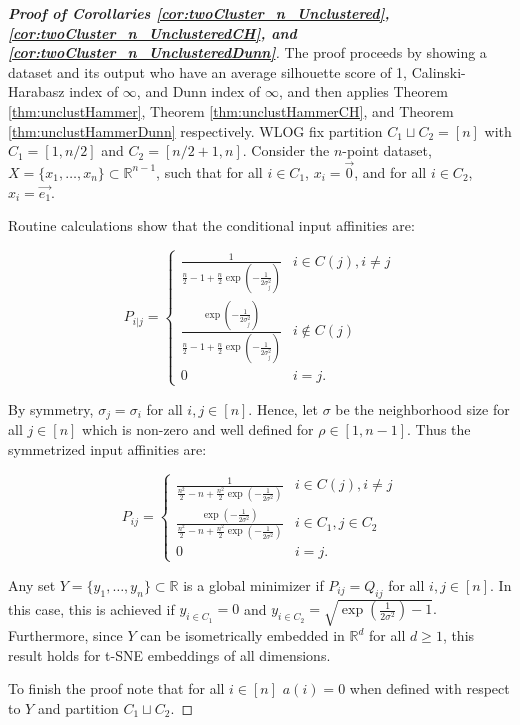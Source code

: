 \begin{proof}[\textbf{Proof of Corollaries \ref{cor:twoCluster_n_Unclustered}, \ref{cor:twoCluster_n_UnclusteredCH}, and \ref{cor:twoCluster_n_UnclusteredDunn}}]
    The proof proceeds by showing a dataset and its output who have an average silhouette score of 1, Calinski-Harabasz index of $\infty$, and Dunn index of $\infty$, and then applies Theorem \ref{thm:unclustHammer}, Theorem \ref{thm:unclustHammerCH}, and Theorem \ref{thm:unclustHammerDunn} respectively. WLOG fix partition $C_1 \sqcup C_2 = [n]$ with $C_1=[1,n/2]$ and $C_2 = [n/2+1,n]$. Consider the $n$-point dataset, $X=\{x_1, \dots, x_n\} \subset \mathbb{R}^{n-1}$, such that for all $i \in C_1$, $x_i = \vec{0}$, and for all $i \in C_2$, $x_i = \vec{e_1}$.
    
    Routine calculations show that the conditional input affinities are:

    $$P_{i|j} = \begin{cases} 
          \frac{1}{\frac{n}{2}-1+\frac{n}{2}\exp\left(-\frac{1}{2\sigma^2_j} \right)} & i \in C(j), i \neq j \\
          \frac{\exp\left(-\frac{1}{2\sigma^2_j} \right)}{\frac{n}{2}-1+\frac{n}{2}\exp\left(-\frac{1}{2\sigma^2_j} \right)} & i \not\in C(j)\\
          0 & i = j.
       \end{cases}$$

    By symmetry, $\sigma_j = \sigma_i$ for all $i,j \in [n].$ Hence, let $\sigma$ be the neighborhood size for all $j \in [n]$ which is non-zero and well defined for $\rho \in [1, n-1].$ Thus the symmetrized input affinities are:

    $$P_{ij} = \begin{cases} 
          \frac{1}{\frac{n^2}{2}-n+\frac{n^2}{2}\exp\left(-\frac{1}{2\sigma^2} \right)} & i \in C(j), i\neq j \\
          \frac{\exp\left(-\frac{1}{2\sigma^2}\right)}{\frac{n^2}{2}-n+\frac{n^2}{2}\exp\left(-\frac{1}{2\sigma^2} \right)} & i \in C_1, j \in C_2 \\
          0 & i = j.
       \end{cases}$$

    Any set $Y = \{ y_1, \dots, y_n\} \subset \mathbb{R}$ is a global minimizer if $P_{ij} = Q_{ij}$ for all $i,j \in [n]$. In this case, this is achieved if $y_{i \in C_1} = 0$ and $y_{i \in C_2} = \sqrt{\exp\left( \frac{1}{2\sigma^2}\right) - 1}.$ Furthermore, since $Y$ can be isometrically embedded in $\mathbb{R}^d$ for all $d \geq 1$, this result holds for t-SNE embeddings of all dimensions. 

    To finish the proof note that for all $i \in [n]$ $a(i)=0$ when defined with respect to $Y$ and partition $C_1 \sqcup C_2.$
\end{proof}

